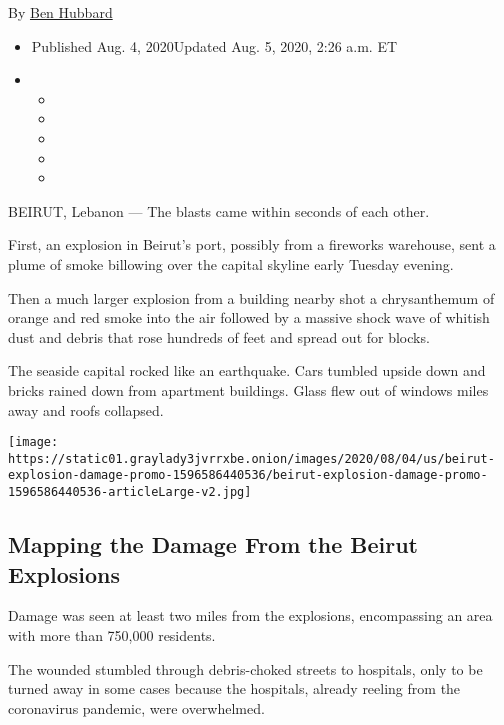 By \href{https://www.nytimes3xbfgragh.onion/by/ben-hubbard}{Ben Hubbard}

\begin{itemize}
\item
  Published Aug. 4, 2020Updated Aug. 5, 2020, 2:26 a.m. ET
\item
  \begin{itemize}
  \item
  \item
  \item
  \item
  \item
  \end{itemize}
\end{itemize}

BEIRUT, Lebanon --- The blasts came within seconds of each other.

First, an explosion in Beirut's port, possibly from a fireworks
warehouse, sent a plume of smoke billowing over the capital skyline
early Tuesday evening.

Then a much larger explosion from a building nearby shot a chrysanthemum
of orange and red smoke into the air followed by a massive shock wave of
whitish dust and debris that rose hundreds of feet and spread out for
blocks.

The seaside capital rocked like an earthquake. Cars tumbled upside down
and bricks rained down from apartment buildings. Glass flew out of
windows miles away and roofs collapsed.

\href{https://www.nytimes3xbfgragh.onion/interactive/2020/08/04/world/middleeast/beirut-explosion-damage.html}{}

\texttt{[image: https://static01.graylady3jvrrxbe.onion/images/2020/08/04/us/beirut-explosion-damage-promo-1596586440536/beirut-explosion-damage-promo-1596586440536-articleLarge-v2.jpg]}

\hypertarget{mapping-the-damage-from-the-beirut-explosions}{%
\subsection{Mapping the Damage From the Beirut
Explosions}\label{mapping-the-damage-from-the-beirut-explosions}}

Damage was seen at least two miles from the explosions, encompassing an
area with more than 750,000 residents.

The wounded stumbled through debris-choked streets to hospitals, only to
be turned away in some cases because the hospitals, already reeling from
the coronavirus pandemic, were overwhelmed.

